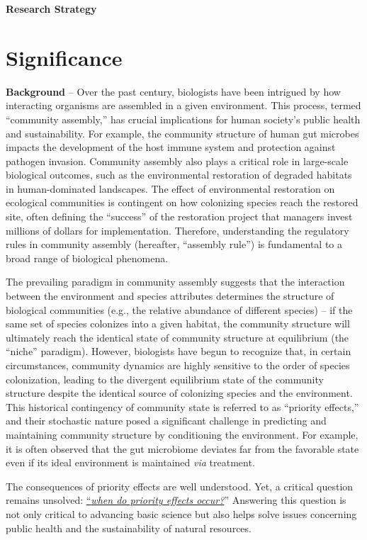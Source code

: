 \documentclass[12pt, class=article, crop=false]{standalone}
\begin{document}
\textbf{Research Strategy}

\section{Significance}

\textbf{Background} --
Over the past century, biologists have been intrigued by how interacting organisms are assembled in a given environment.
This process, termed ``community assembly,'' has crucial implications for human society's public health and sustainability.
For example, the community structure of human gut microbes impacts the development of the host immune system and protection against pathogen invasion.
Community assembly also plays a critical role in large-scale biological outcomes, such as the environmental restoration of degraded habitats in human-dominated landscapes.
The effect of environmental restoration on ecological communities is contingent on how colonizing species reach the restored site, often defining the ``success'' of the restoration project that managers invest millions of dollars for implementation.
Therefore, understanding the regulatory rules in community assembly (hereafter, ``assembly rule'') is fundamental to a broad range of biological phenomena.

The prevailing paradigm in community assembly suggests that the interaction between the environment and species attributes determines the structure of biological communities  (e.g., the relative abundance of different species) -- if the same set of species colonizes into a given habitat, the community structure will ultimately reach the identical state of community structure at equilibrium (the ``niche'' paradigm).
However, biologists have begun to recognize that, in certain circumstances, community dynamics are highly sensitive to the order of species colonization, leading to the divergent equilibrium state of the community structure despite the identical source of colonizing species and the environment.
This historical contingency of community state is referred to as ``priority effects,'' and their stochastic nature posed a significant challenge in predicting and maintaining community structure by conditioning the environment.
For example, it is often observed that the gut microbiome deviates far from the favorable state even if its ideal environment is maintained \textit{via} treatment.

The consequences of priority effects are well understood. Yet, a critical question remains unsolved: \ul{``\textit{when do priority effects occur?}}'' 
Answering this question is not only critical to advancing basic science but also helps solve issues concerning public health and the sustainability of natural resources.
\end{document}
